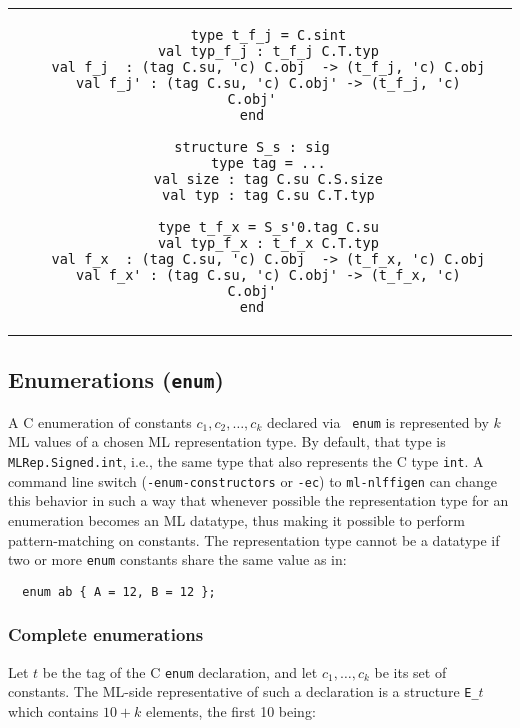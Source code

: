 \documentclass[titlepage,letterpaper]{article}
\newcommand{\gentool}{{\tt ml-nlffigen}}
\begin{document}
\begin{small}
\begin{center}
\begin{tabular}{c|c}
\begin{minipage}{4in}
\begin{verbatim}
    type t_f_j = C.sint
    val typ_f_j : t_f_j C.T.typ
    val f_j  : (tag C.su, 'c) C.obj  -> (t_f_j, 'c) C.obj
    val f_j' : (tag C.su, 'c) C.obj' -> (t_f_j, 'c) C.obj'
end

structure S_s : sig
    type tag = ...
    val size : tag C.su C.S.size
    val typ : tag C.su C.T.typ

    type t_f_x = S_s'0.tag C.su
    val typ_f_x : t_f_x C.T.typ
    val f_x  : (tag C.su, 'c) C.obj  -> (t_f_x, 'c) C.obj
    val f_x' : (tag C.su, 'c) C.obj' -> (t_f_x, 'c) C.obj'
end

\end{verbatim}
\end{minipage}
\end{tabular}
\end{center}
\end{small}

\subsection{Enumerations ({\tt enum})}

A C enumeration of constants $c_1, c_2, \ldots, c_k$ declared via {\tt
  enum} is represented by $k$ ML values of a chosen ML representation
type.  By default, that type is {\tt MLRep.Signed.int}, i.e., the same
type that also represents the C type {\tt int}.  A command line switch
({\tt -enum-constructors} or {\tt -ec}) to {\gentool} can change this
behavior in such a way that whenever possible the representation type
for an enumeration becomes an ML datatype, thus making it possible to
perform pattern-matching on constants.  The representation type cannot be a
datatype if two or more {\tt enum} constants share the same value as in:

\begin{verbatim}
  enum ab { A = 12, B = 12 };
\end{verbatim}

\subsubsection*{Complete enumerations}

Let $t$ be the tag of the C {\tt enum} declaration, and let
$c_1,\ldots,c_k$ be its set of constants.  The ML-side representative
of such a declaration is a structure {\tt E\_$t$} which contains $10+k$
elements, the first 10 being:
\end{document}
